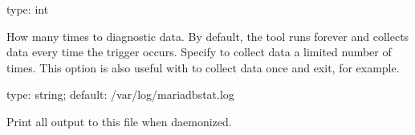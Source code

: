 \documentclass[letterpaper,10pt,english]{sphinxmanual}
\begin{document}

\begin{fulllineitems}
\label{\detokenize{mariadb-stat:cmdoption-mariadb-stat-iterations}}
type: int

How many times to {\hyperref[\detokenize{mariadb-stat:cmdoption-mariadb-stat-collect}]{}} diagnostic data.  By default, the tool
runs forever and collects data every time the trigger occurs.
Specify {\hyperref[\detokenize{mariadb-stat:cmdoption-mariadb-stat-iterations}]{}} to collect data a limited number of times.
This option is also useful with  to collect data once and
exit, for example.

\end{fulllineitems}


\begin{fulllineitems}
\label{\detokenize{mariadb-stat:cmdoption-mariadb-stat-log}}
type: string; default: /var/log/mariadb\sphinxhyphen{}stat.log

Print all output to this file when daemonized.

\end{fulllineitems}

\end{document}
